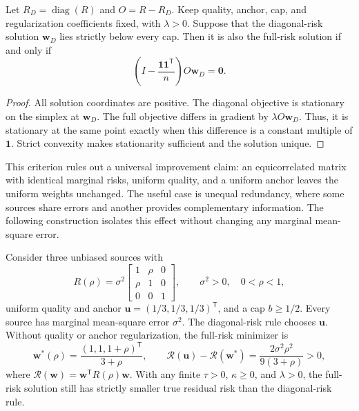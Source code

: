 \begin{proposition}
\label{prop:joint-structure-criterion}
Let $R_D=\operatorname{diag}(R)$ and $O=R-R_D$. Keep quality, anchor, cap,
and regularization coefficients fixed, with $\lambda>0$. Suppose that the
diagonal-risk solution $\boldsymbol w_D$ lies strictly below every cap. Then
it is also the full-risk solution if and only if
\begin{equation}
 \left(I-\frac{\boldsymbol1\boldsymbol1^{\mathsf T}}{n}\right)
 O\boldsymbol w_D=\boldsymbol0.
 \label{eq:joint-structure-condition}
\end{equation}
\end{proposition}

\begin{proof}
All solution coordinates are positive. The diagonal objective is stationary
on the simplex at $\boldsymbol w_D$. The full objective differs in gradient
by $\lambda O\boldsymbol w_D$. Thus, it is stationary at the same point
exactly when this difference is a constant multiple of $\boldsymbol1$.
Strict convexity makes stationarity sufficient and the solution unique.
\end{proof}

This criterion rules out a universal improvement claim: an equicorrelated
matrix with identical marginal risks, uniform quality, and a uniform anchor
leaves the uniform weights unchanged.
The useful case is unequal redundancy, where some sources share errors and
another provides complementary information. The following construction
isolates this effect without changing any marginal mean-square error.

\begin{proposition}
\label{prop:matched-marginal-gain}
Consider three unbiased sources with
\begin{equation}
 R(\rho)=\sigma^2
 \begin{bmatrix}1&\rho&0\\\rho&1&0\\0&0&1\end{bmatrix},
 \qquad \sigma^2>0,\quad 0<\rho<1,
 \label{eq:matched-marginal-matrix}
\end{equation}
uniform quality and anchor
$\boldsymbol u=(1/3,1/3,1/3)^{\mathsf T}$, and a cap $b\ge1/2$.
Every source has marginal mean-square error $\sigma^2$.
The diagonal-risk rule chooses $\boldsymbol u$.
Without quality or anchor regularization, the full-risk minimizer is
\begin{equation}
 \boldsymbol w^*(\rho)=
 \frac{(1,1,1+\rho)^{\mathsf T}}{3+\rho},
 \qquad
 \mathcal R(\boldsymbol u)-\mathcal R(\boldsymbol w^*)
 =\frac{2\sigma^2\rho^2}{9(3+\rho)}>0,
 \label{eq:matched-marginal-gap}
\end{equation}
where $\mathcal R(\boldsymbol w)=\boldsymbol w^{\mathsf T}R(\rho)\boldsymbol w$.
With any finite $\tau>0$, $\kappa\ge0$, and $\lambda>0$, the full-risk
solution still has strictly smaller true residual risk than the
diagonal-risk rule.
\end{proposition}

